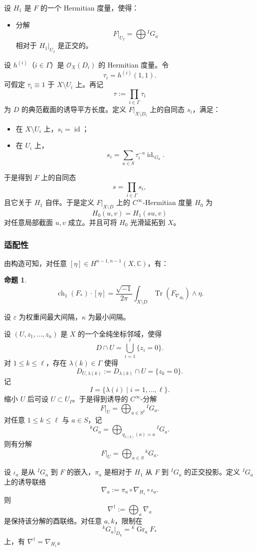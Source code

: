 \documentclass[12pt,a4paper]{article}
\newtheorem{proposition}[theorem]{命题}
\newcommand{\ch}{\operatorname{ch}}
\newcommand{\Tr}{\operatorname{Tr}}
\newcommand{\Gr}{\operatorname{Gr}}
\newcommand{\Id}{\operatorname{id}}
\begin{document}
设 \(H_1\) 是 \(F\) 的一个 Hermitian 度量，使得：
\begin{itemize}
\item 分解
\[
F|_{U_I}=\bigoplus {}^IG_a
\]
相对于 \(H_1|_{U_I}\) 是正交的。
\end{itemize}

设 \(h^{(i)}\)（\(i\in\Gamma\)）是 \( \mathcal O_X(D_i)\) 的 Hermitian 度量。令
\[
\tau_i=h^{(i)}(1,1).
\]
可假定 \(\tau_i\equiv 1\) 于 \(X\setminus U_i\) 上。再记
\[
\tau:=\prod_{i\in\Gamma}\tau_i
\]
为 \(D\) 的典范截面的诱导平方长度。定义 \(F|_{X\setminus D_i}\) 上的自同态 \(s_i\)，满足：
\begin{itemize}
\item 在 \(X\setminus U_i\) 上，\(s_i=\Id\)；
\item 在 \(U_i\) 上，
\[
s_i=\sum_{a\in S}\tau_i^{-a}\Id_{{}^iG_a}.
\]
\end{itemize}
于是得到 \(F\) 上的自同态
\[
s=\prod_{i\in\Gamma} s_i,
\]
且它关于 \(H_1\) 自伴。于是定义 \(F|_{X\setminus D}\) 上的 \(C^\infty\)-Hermitian 度量 \(H_0\) 为
\[
H_0(u,v)=H_1(su,v)
\]
对任意局部截面 \(u,v\) 成立。并且可将 \(H_0\) 光滑延拓到 \(X\)。

\subsubsection{适配性}

由构造可知，对任意 \([\eta]\in H^{n-1,n-1}(X,\mathbb C)\)，有：

\begin{proposition}
\[
\ch_1(F_*)\cdot [\eta]
=
\frac{\sqrt{-1}}{2\pi}
\int_{X\setminus D}\Tr(F_{\nabla_{H_0}})\wedge \eta.
\]
\end{proposition}

设 \(\varepsilon\) 为权重间最大间隔，\(\kappa\) 为最小间隔。

设 \((U,z_1,\dots,z_n)\) 是 \(X\) 的一个全纯坐标邻域，使得
\[
D\cap U=\bigcup_{i=1}^\ell \{z_i=0\}.
\]
对 \(1\le k\le \ell\)，存在 \(\lambda(k)\in \Gamma\) 使得
\[
D_{U,\lambda(k)}:=D_{\lambda(k)}\cap U=\{z_k=0\}.
\]
记
\[
I=\{\lambda(i)\mid i=1,\dots,\ell\}.
\]
缩小 \(U\) 后可设 \(U\subset U_I\)。于是得到诱导的 \(C^\infty\)-分解
\[
F|_U=\bigoplus_{a\in S^I} {}^IG_a.
\]
对任意 \(1\le k\le \ell\) 与 \(a\in S\)，记
\[
{}^kG_a=\bigoplus_{q_{\lambda(k)}(a)=a} {}^IG_a.
\]
则有分解
\[
F|_U=\bigoplus_{a\in S} {}^kG_a. \tag{4}
\]

设 \(\iota_a\) 是从 \({}^IG_a\) 到 \(F\) 的嵌入，\(\pi_a\) 是相对于 \(H_1\) 从 \(F\) 到 \({}^IG_a\) 的正交投影。定义 \({}^IG_a\) 上的诱导联络
\[
\nabla_a:=\pi_a\circ \nabla_{H_1}\circ \iota_a.
\]
则
\[
\nabla^\dagger:=\bigoplus_a \nabla_a
\]
是保持该分解的酉联络。对任意 \(a,k\)，限制在
\[
{}^kG_a|_{D_k}={}^k\Gr_a F_*
\]
上，有 \(\nabla^\dagger=\nabla_{H_1}\)。
\end{document}
